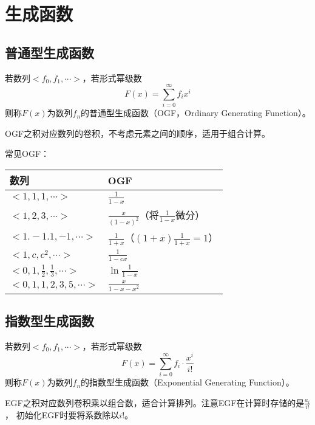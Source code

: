 \section{生成函数}\label{GF}
\subsection{普通型生成函数}
若数列$<f_0,f_1,\cdots>$，若形式幂级数
\begin{displaymath}
	F(x)=\sum_{i=0}^\infty{f_ix^i}
\end{displaymath}
则称$F(x)$为数列${f_n}$的普通型生成函数（OGF，Ordinary Generating Function）。

OGF之积对应数列的卷积，不考虑元素之间的顺序，适用于组合计算。

常见OGF：

\begin{tabular}{|l|l|}
	\hline
	数列                                   & OGF                                          \\
	\hline
	$<1,1,1,\cdots>$                       & $\frac{1}{1-x}$                              \\
	\hline
	$<1,2,3,\cdots>$                       & $\frac{x}{(1-x)^2}$（将$\frac{1}{1-x}$微分） \\
	\hline
	$<1.-1.1,-1,\cdots>$                   & $\frac{1}{1+x}$（$(1+x)\frac{1}{1+x}=1$）    \\
	\hline
	$<1,c,c^2,\cdots>$                     & $\frac{1}{1-cx}$                             \\
	\hline
	$<0,1,\frac{1}{2},\frac{1}{3},\cdots>$ & $\ln\frac{1}{1-x}$                           \\
	\hline
	$<0,1,1,2,3,5,\cdots>$ & $\frac{x}{1-x-x^2}$\\
	\hline
\end{tabular}
\subsection{指数型生成函数}
若数列$<f_0,f_1,\cdots>$，若形式幂级数
\begin{displaymath}
	F(x)=\sum_{i=0}^\infty{f_i\cdot\frac{x^i}{i!}}
\end{displaymath}
则称$F(x)$为数列${f_n}$的指数型生成函数（Exponential Generating Function）。

EGF之积对应数列卷积乘以组合数，适合计算排列。注意EGF在计算时存储的是$\frac{a_i}{i!}$，
初始化EGF时要将系数除以$i!$。

